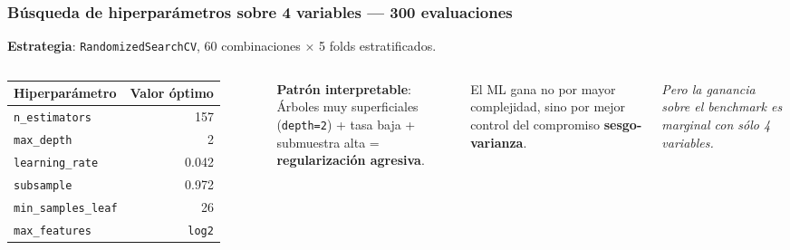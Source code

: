 \begin{frame}
\frametitle{Búsqueda de hiperparámetros sobre 4 variables — 300 evaluaciones}
\small
\textbf{Estrategia}: \texttt{RandomizedSearchCV}, 60 combinaciones × 5 folds estratificados.

\vspace{0.2cm}
\begin{columns}[T]
\centering
\footnotesize
\begin{tabular}{lr}
\toprule
Hiperparámetro & Valor óptimo \\
\midrule
\texttt{n\_estimators} & 157 \\
\texttt{max\_depth} & 2 \\
\texttt{learning\_rate} & 0.042 \\
\texttt{subsample} & 0.972 \\
\texttt{min\_samples\_leaf} & 26 \\
\texttt{max\_features} & \texttt{log2} \\
\bottomrule
\end{tabular}

\small
\textbf{Patrón interpretable}:\\[0.2cm]
Árboles muy superficiales (\texttt{depth=2}) + tasa baja + submuestra alta = \textbf{regularización agresiva}.

El ML gana no por mayor complejidad, sino por mejor control del compromiso \textbf{sesgo-varianza}.

\vspace{0.2cm}
\textit{Pero la ganancia sobre el benchmark es marginal con sólo 4 variables.}
\end{columns}
\end{frame}

